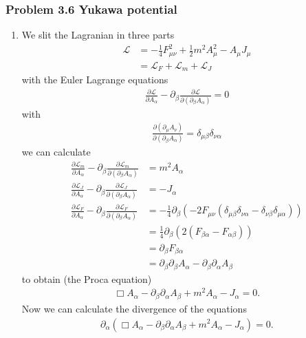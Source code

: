 \documentclass[10pt,a4paper]{book}
\theoremstyle{definition}
\begin{document}
\subsubsection{Problem 3.6 Yukawa potential}
\begin{enumerate}[label=(\alph*)]
\item We slit the Lagranian in three parts
\begin{align}
\mathscr{L}&=-\frac{1}{4}F_{\mu\nu}^2+\frac{1}{2}m^2A_\mu^2-A_\mu J_\mu\\
&=\mathscr{L}_F+\mathscr{L}_m+\mathscr{L}_J
\end{align}
with the Euler Lagrange equations
\begin{align}
        \frac{\partial\mathscr{L}}{\partial A_\alpha}-\partial_\beta\frac{\partial\mathscr{L}}{\partial(\partial_\beta A_\alpha)}=0
\end{align}
with
\begin{align}
    \frac{\partial(\partial_\mu A_\nu)}{\partial(\partial_\beta A_\alpha)}=\delta_{\mu\beta}\delta_{\nu\alpha}
\end{align}
we can calculate
\begin{align}
    \frac{\partial\mathscr{L}_m}{\partial A_\alpha}-\partial_\beta\frac{\partial\mathscr{L}_m}{\partial(\partial_\beta A_\alpha)}&=m^2A_\alpha\\
    \frac{\partial\mathscr{L}_J}{\partial A_\alpha}-\partial_\beta\frac{\partial\mathscr{L}_J}{\partial(\partial_\beta A_\alpha)}&=-J_\alpha\\
    \frac{\partial\mathscr{L}_F}{\partial A_\alpha}-\partial_\beta\frac{\partial\mathscr{L}_F}{\partial(\partial_\beta A_\alpha)}&=-\frac{1}{4}\partial_\beta\left(-2F_{\mu\nu}(\delta_{\mu\beta}\delta_{\nu\alpha}-\delta_{\nu\beta}\delta_{\mu\alpha})\right)\\
    &=\frac{1}{4}\partial_\beta\left(2(F_{\beta\alpha}-F_{\alpha\beta})\right)\\
    &=\partial_\beta F_{\beta\alpha}\\
    &=\partial_\beta\partial_\beta A_\alpha-\partial_\beta\partial_\alpha A_\beta
\end{align}
to obtain (the Proca equation)
\begin{align}
    \Box A_\alpha-\partial_\beta\partial_\alpha A_\beta+m^2A_\alpha-J_\alpha=0.
\end{align}
Now we can calculate the divergence of the equations
\begin{align}
    \partial_\alpha\left(\Box A_\alpha-\partial_\beta\partial_\alpha A_\beta+m^2A_\alpha-J_\alpha\right)=0.\\

\end{align}
\end{enumerate}
\end{document}
